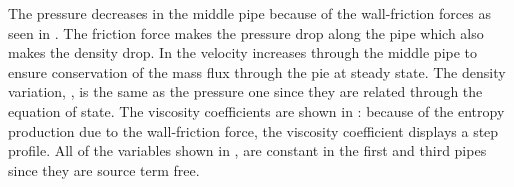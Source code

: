 %
The pressure decreases in the middle pipe because of the wall-friction forces as seen in . The friction force makes the pressure drop along the pipe which also makes the density drop. In  the velocity increases through the middle pipe to ensure conservation of the mass flux through the pie at steady state. The density variation, , is the same as the pressure one since they are related through the equation of state. The viscosity coefficients are shown in : because of the entropy production due to the wall-friction force, the viscosity coefficient displays a step profile. All of the variables shown in , are constant in the first and third pipes since they are source term free.
